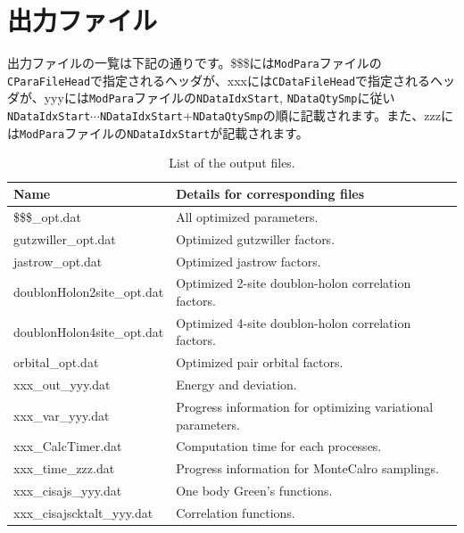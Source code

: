 \newpage
\section{出力ファイル}
\label{Sec:outputfile}
出力ファイルの一覧は下記の通りです。\$\$\$には\verb|ModPara|ファイルの\verb|CParaFileHead|で指定されるヘッダが、xxxには\verb|CDataFileHead|で指定されるヘッダが、yyyには\verb|ModPara|ファイルの\verb|NDataIdxStart|, \verb|NDataQtySmp|に従い\verb|NDataIdxStart|$\cdots$\verb|NDataIdxStart|+\verb|NDataQtySmp|の順に記載されます。また、zzzには\verb|ModPara|ファイルの\verb|NDataIdxStart|が記載されます。

 \begin{table}[h!]
\begin{center}
  \begin{tabular}{|ll|} \hline
           Name     & Details for corresponding files       \\   \hline\hline
           \$\$\$\_opt.dat       &  All optimized parameters.       \\ \hline 
           gutzwiller\_opt.dat       &   Optimized gutzwiller factors.  \\
           jastrow\_opt.dat        &  Optimized jastrow factors.         \\ 
           doublonHolon2site\_opt.dat  &   Optimized 2-site doublon-holon correlation factors.  \\  
           doublonHolon4site\_opt.dat  &   Optimized 4-site doublon-holon correlation factors. \\  
           orbital\_opt.dat  &   Optimized pair orbital factors. \\  \hline
           xxx\_out\_yyy.dat &  Energy and deviation.\\ 
           xxx\_var\_yyy.dat &  Progress information for optimizing variational parameters.\\  \hline
           xxx\_CalcTimer.dat & Computation time for each processes.\\  
           xxx\_time\_zzz.dat & Progress information for MonteCalro samplings.\\  \hline
           \hline
           xxx\_cisajs\_yyy.dat & One body Green's functions.\\
           xxx\_cisajscktalt\_yyy.dat & Correlation functions.\\
\hline
  \end{tabular}
\end{center}
\caption{List of the output files. }
\label{Table:Output}
\end{table}%


